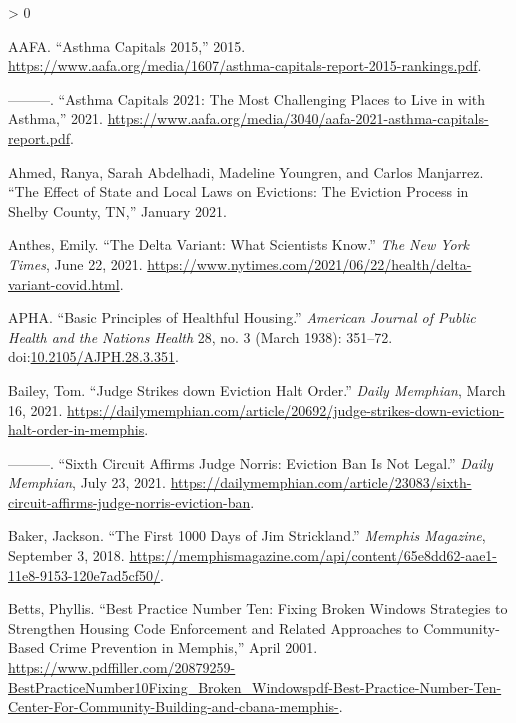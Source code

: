 \documentclass[
  openany]{book}
\newlength{\cslhangindent}
\newenvironment{CSLReferences}[2] %
 {%
  \setlength{\parindent}{0pt}
  \ifodd #1 \everypar{\setlength{\hangindent}{\cslhangindent}}\ignorespaces\fi
  \ifnum #2 > 0
  \setlength{\parskip}{#2\baselineskip}
  \fi
 }%
 {}
\begin{document}
\hypertarget{refs}{}
\begin{CSLReferences}{1}{0}
\leavevmode\hypertarget{ref-aafa2015}{}%
AAFA. {``Asthma Capitals 2015,''} 2015. \url{https://www.aafa.org/media/1607/asthma-capitals-report-2015-rankings.pdf}.

\leavevmode\hypertarget{ref-aafa2021}{}%
---------. {``Asthma Capitals 2021: The Most Challenging Places to Live in with Asthma,''} 2021. \url{https://www.aafa.org/media/3040/aafa-2021-asthma-capitals-report.pdf}.

\leavevmode\hypertarget{ref-ahmed2021}{}%
Ahmed, Ranya, Sarah Abdelhadi, Madeline Youngren, and Carlos Manjarrez. {``The Effect of State and Local Laws on Evictions: The Eviction Process in Shelby County, TN,''} January 2021.

\leavevmode\hypertarget{ref-anthes2021}{}%
Anthes, Emily. {``The Delta Variant: What Scientists Know.''} \emph{The New York Times}, June 22, 2021. \url{https://www.nytimes.com/2021/06/22/health/delta-variant-covid.html}.

\leavevmode\hypertarget{ref-apha1938}{}%
APHA. {``Basic Principles of Healthful Housing.''} \emph{American Journal of Public Health and the Nations Health} 28, no. 3 (March 1938): 351--72. doi:\href{https://doi.org/10.2105/AJPH.28.3.351}{10.2105/AJPH.28.3.351}.

\leavevmode\hypertarget{ref-bailey2021}{}%
Bailey, Tom. {``Judge Strikes down Eviction Halt Order.''} \emph{Daily Memphian}, March 16, 2021. \url{https://dailymemphian.com/article/20692/judge-strikes-down-eviction-halt-order-in-memphis}.

\leavevmode\hypertarget{ref-bailey2021a}{}%
---------. {``Sixth Circuit Affirms Judge Norris: Eviction Ban Is Not Legal.''} \emph{Daily Memphian}, July 23, 2021. \url{https://dailymemphian.com/article/23083/sixth-circuit-affirms-judge-norris-eviction-ban}.

\leavevmode\hypertarget{ref-baker2018}{}%
Baker, Jackson. {``The First 1000 Days of Jim Strickland.''} \emph{Memphis Magazine}, September 3, 2018. \url{https://memphismagazine.com/api/content/65e8dd62-aae1-11e8-9153-120e7ad5cf50/}.

\leavevmode\hypertarget{ref-betts2001}{}%
Betts, Phyllis. {``Best Practice Number Ten: Fixing Broken Windows {{}} Strategies to Strengthen Housing Code Enforcement and Related Approaches to Community-Based Crime Prevention in Memphis,''} April 2001. \url{https://www.pdffiller.com/20879259-BestPracticeNumber10Fixing_Broken_Windowspdf-Best-Practice-Number-Ten-Center-For-Community-Building-and-cbana-memphis-}.


\end{CSLReferences}
\end{document}
